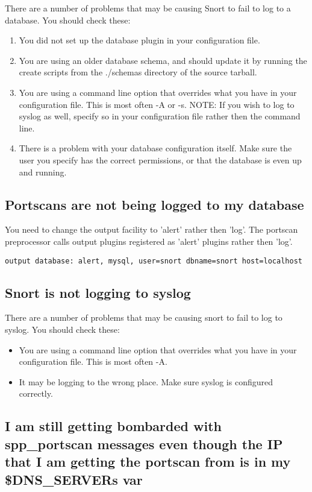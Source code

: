 \documentclass{article}
\begin{document}
There are a number of problems that may be causing Snort to fail to log to a 
database.  You should check these:
\begin{enumerate}
\item You did not set up the database plugin in your configuration file.
\item  You are using an older database schema, and should update it by running the create scripts from the ./schemas directory of the source tarball.
\item You are using a command line option that overrides what you have in your configuration file.  This is most often -A or -s.  NOTE: If you wish to log to syslog as well, specify so in your configuration file rather then the command line.
\item There is a problem with your database configuration itself.  Make sure the user you specify has the correct permissions, or that the database is even up and running.
\end{enumerate}

\subsection{Portscans are not being logged to my database }

You need to change the output facility to 'alert' rather then 'log'.  The 
portscan preprocessor calls output plugins registered as 'alert' plugins 
rather then 'log'.

\begin{verbatim}output database: alert, mysql, user=snort dbname=snort host=localhost\end{verbatim}

\subsection{Snort is not logging to syslog}

There are a number of problems that may be causing snort to fail to log to syslog.  You should check these:
\begin{itemize}
\item You are using a command line option that overrides what you have in your configuration file.  This is most often -A.
\item It may be logging to the wrong place.  Make sure syslog is configured correctly.
\end{itemize}


\subsection{I am still getting bombarded with spp\_portscan messages even though the IP that I am getting the portscan from is in my \$DNS\_SERVERs var }
\end{document}
